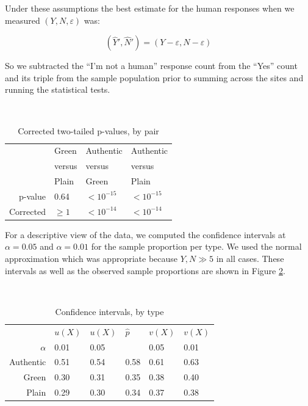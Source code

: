 \documentclass[twoside,letterpaper]{soups}
\begin{document}

Under these assumptions the best estimate for the human responses when we measured $(Y,N,\varepsilon)$ was:

\[ (\hat Y',\hat N')=(Y-\varepsilon,N-\varepsilon) \]

So we subtracted the ``I'm not a human'' response count from the ``Yes'' count and its triple from the sample population prior to summing across the sites and running the statistical tests.

\begin{table}
\centering
\caption{Corrected two-tailed p-values, by pair}
\mbox{}\\
\begin{tabular}{|r|l|l|l|}
\hline
                    & Green     & Authentic             & Authentic \\
                    & versus    & versus                & versus    \\
                    & Plain     & Green                 & Plain     \\
\hline
p-value             & 0.64    & $<10^{-15}$ & $<10^{-15}$ \\
\hline
Corrected           & $\ge 1$   & $<10^{-14}$ & $<10^{-14}$ \\
\hline
\end{tabular}
\label{fig:results:pvalues}
\end{table}

For a descriptive view of the data, we computed the confidence intervals at $\alpha = 0.05$ and $\alpha = 0.01$ for the sample proportion per type. We used the normal approximation which was appropriate because $Y, N \gg 5$ in all cases. These intervals as well as the observed sample proportions are shown in Figure \ref{fig:results:cintervals}.

\begin{table}
\centering
\caption{Confidence intervals, by type}
\mbox{}\\
\begin{tabular}{|r|l|l|l|l|l|}
\hline
            & $u(X)$    & $u(X)$    & $\hat{p}$ & $v(X)$    & $v(X)$ \\
$\alpha$    & 0.01      & 0.05      &           & 0.05      & 0.01 \\
\hline
Authentic   & 0.51      & 0.54      & 0.58      & 0.61      & 0.63 \\
\hline
Green       & 0.30      & 0.31      & 0.35      & 0.38      & 0.40 \\
\hline
Plain       & 0.29      & 0.30      & 0.34      & 0.37      & 0.38 \\
\hline
\end{tabular}
\label{fig:results:cintervals}
\end{table}
\end{document}
